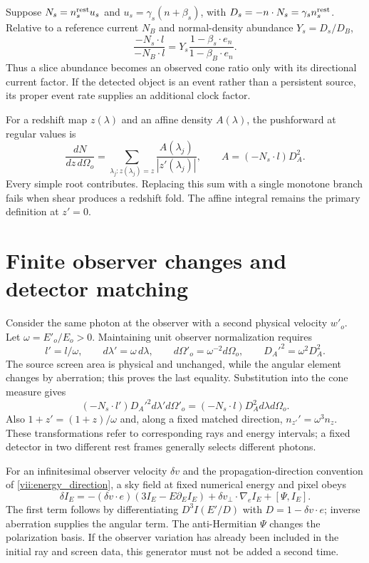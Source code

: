 Suppose $N_s=n_s^{\rm rest}u_s$ and $u_s=\gamma_s(n+\beta_s)$, with $D_s=-n\cdot N_s=\gamma_sn_s^{\rm rest}$. Relative to a reference current $N_B$ and normal-density abundance $Y_s=D_s/D_B$,
\begin{equation}\label{vii:count_abundance}
\frac{-N_s\cdot l}{-N_B\cdot l}
=Y_s\frac{1-\beta_s\cdot e_n}{1-\beta_B\cdot e_n}.
\end{equation}
Thus a slice abundance becomes an observed cone ratio only with its directional current factor. If the detected object is an event rather than a persistent source, its proper event rate supplies an additional clock factor.

For a redshift map $z(\lambda)$ and an affine density $A(\lambda)$, the pushforward at regular values is
\begin{equation}\label{vii:redshift_pushforward}
\frac{dN}{dz\,d\Omega_o}=
\sum_{\lambda_j:z(\lambda_j)=z}
\frac{A(\lambda_j)}{|z'(\lambda_j)|},\qquad
A=(-N_s\cdot l)D_A^2.
\end{equation}
Every simple root contributes. Replacing this sum with a single monotone branch fails when shear produces a redshift fold. The affine integral remains the primary definition at $z'=0$.

\section{Finite observer changes and detector matching}
Consider the same photon at the observer with a second physical velocity $w'_o$. Let $\omega=E'_o/E_o>0$. Maintaining unit observer normalization requires
\begin{equation}\label{vii:observer_scalings}
l'=l/\omega,\qquad d\lambda'=\omega\,d\lambda,\qquad
d\Omega'_o=\omega^{-2}d\Omega_o,\qquad D_A'^2=\omega^2D_A^2.
\end{equation}
The source screen area is physical and unchanged, while the angular element changes by aberration; this proves the last equality. Substitution into the cone measure gives
\begin{equation}\label{vii:count_invariance}
(-N_s\cdot l')D_A'^2d\lambda' d\Omega'_o
=(-N_s\cdot l)D_A^2d\lambda d\Omega_o.
\end{equation}
Also $1+z'=(1+z)/\omega$ and, along a fixed matched direction, $n_{z'}'=\omega^3n_z$. These transformations refer to corresponding rays and energy intervals; a fixed detector in two different rest frames generally selects different photons.

For an infinitesimal observer velocity $\delta v$ and the propagation-direction convention of \eqref{vii:energy_direction}, a sky field at fixed numerical energy and pixel obeys
\begin{equation}\label{vii:observer_generator}
\delta I_E=-(\delta v\cdot e)(3I_E-E\partial_EI_E)
+\delta v_\perp\cdot\nabla_eI_E+[\Psi,I_E].
\end{equation}
The first term follows by differentiating $D^3I(E'/D)$ with $D=1-\delta v\cdot e$; inverse aberration supplies the angular term. The anti-Hermitian $\Psi$ changes the polarization basis. If the observer variation has already been included in the initial ray and screen data, this generator must not be added a second time.

